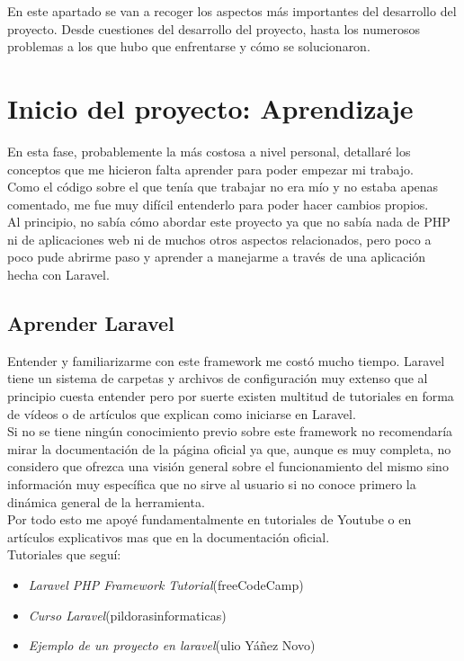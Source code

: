En este apartado se van a recoger los aspectos más importantes del desarrollo del proyecto. Desde cuestiones del desarrollo del proyecto, hasta los numerosos problemas a los que hubo que enfrentarse y cómo se solucionaron.
\section{Inicio del proyecto: Aprendizaje}
En esta fase, probablemente la más costosa a nivel personal, detallaré los conceptos que me hicieron falta aprender para poder empezar mi trabajo.\\
Como el código sobre el que tenía que trabajar no era mío y no estaba apenas comentado, me fue muy difícil entenderlo para poder hacer cambios propios.\\
Al principio, no sabía cómo abordar este proyecto ya que no sabía nada de PHP ni de aplicaciones web ni de muchos otros aspectos relacionados, pero poco a poco pude abrirme paso y aprender a manejarme a través de una aplicación hecha con Laravel.\\
\subsection{Aprender Laravel} 
Entender y familiarizarme con este framework me costó mucho tiempo. Laravel tiene un sistema de carpetas y archivos de configuración muy extenso que al principio cuesta entender pero por suerte existen multitud de tutoriales en forma de vídeos o de artículos que explican como iniciarse en Laravel.\\
Si no se tiene ningún conocimiento previo sobre este framework no recomendaría mirar la documentación de la página oficial ya que, aunque es muy completa, no considero que ofrezca una visión general sobre el funcionamiento del mismo sino información muy específica que no sirve al usuario si no conoce primero la dinámica general de la herramienta.\\
Por todo esto me apoyé fundamentalmente en tutoriales de Youtube o en artículos explicativos mas que en la documentación oficial.\\
Tutoriales que seguí:
\begin{itemize}
    \item \textit{Laravel PHP Framework Tutorial}(freeCodeCamp)\cite{TutorialLaravel}
    \item \textit{Curso Laravel}(pildorasinformaticas)\cite{TutorialLaravel2}
    \item \textit{Ejemplo de un proyecto en laravel}(ulio Yáñez Novo)\cite{PrimerProyecto}
\end{itemize}
